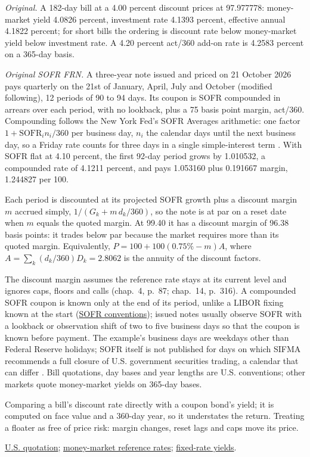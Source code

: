 \begin{qfmethod}
\emph{Original.} A 182-day bill at a 4.00 percent discount prices at 97.977778: money-market yield 4.0826 percent, investment rate 4.1393 percent, effective annual 4.1822 percent; for short bills the ordering is discount rate below money-market yield below investment rate. A 4.20 percent act/360 add-on rate is 4.2583 percent on a 365-day basis.

\emph{Original SOFR FRN.} A three-year note issued and priced on 21 October 2026 pays quarterly on the 21st of January, April, July and October (modified following), 12 periods of 90 to 94 days. Its coupon is SOFR compounded in arrears over each period, with no lookback, plus a 75 basis point margin, act/360. Compounding follows the New York Fed's SOFR Averages arithmetic: one factor $1+\text{SOFR}_in_i/360$ per business day, $n_i$ the calendar days until the next business day, so a Friday rate counts for three days in a single simple-interest term \citep[``Calculation Methodology for the SOFR Averages and Index'']{nyfed-sofr-averages-index}. With SOFR flat at 4.10 percent, the first 92-day period grows by 1.010532, a compounded rate of 4.1211 percent, and pays 1.053160 plus 0.191667 margin, 1.244827 per 100.

Each period is discounted at its projected SOFR growth plus a discount margin $m$ accrued simply, $1/(G_k+m\,d_k/360)$, so the note is at par on a reset date when $m$ equals the quoted margin. At 99.40 it has a discount margin of 96.38 basis points: it trades below par because the market requires more than its quoted margin. Equivalently, $P=100+100(0.75\%-m)A$, where $A=\sum_k(d_k/360)D_k=2.8062$ is the annuity of the discount factors.

 The discount margin assumes the reference rate stays at its current level and ignores caps, floors and calls (chap.~4, p.~87; chap.~14, p.~316). A compounded SOFR coupon is known only at the end of its period, unlike a LIBOR fixing known at the start (\hyperref[def:interest-rate-swaps]{SOFR conventions}); issued notes usually observe SOFR with a lookback or observation shift of two to five business days so that the coupon is known before payment. The example's business days are weekdays other than Federal Reserve holidays; SOFR itself is not published for days on which SIFMA recommends a full closure of U.S. government securities trading, a calendar that can differ \citep[``Details on Publication and Revisions for the Treasury Repo Reference Rates'']{nyfed-sofr-averages-index}. Bill quotations, day bases and year lengths are U.S. conventions; other markets quote money-market yields on 365-day bases.

 Comparing a bill's discount rate directly with a coupon bond's yield; it is computed on face value and a 360-day year, so it understates the return. Treating a floater as free of price risk: margin changes, reset lags and caps move its price.

 \hyperref[conv:us-rate-quotation]{U.S. quotation}; \hyperref[def:money-market-reference-rates]{money-market reference rates}; \hyperref[def:bond-yield-spread-measures]{fixed-rate yields}.

\end{qfmethod}
